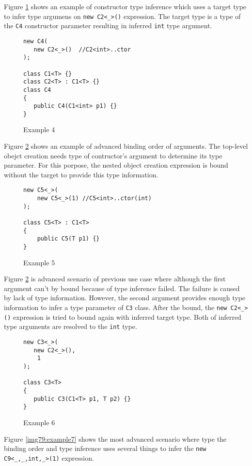 Figure \ref{img76:example4} shows an example of constructor type inference which uses a target type to infer type argumens on \texttt{new C2<\_>()} expression.
The target type is a type of the \texttt{C4} constructor parameter resulting in inferred \texttt{int} type argument.
\begin{figure}[h]
\begin{lstlisting}[style=csharp, showstringspaces=false]
new C4(
   new C2<_>()  //C2<int>..ctor
);

class C1<T> {}
class C2<T> : C1<T> {}
class C4 
{
   public C4(C1<int> p1) {}
}
\end{lstlisting}
\caption{Example 4}
\label{img76:example4}
\end{figure}
Figure \ref{img77:example5} shows an example of advanced binding order of arguments.
The top-level obejct creation needs type of contructor's argument to determine its type parameter.
For this porpose, the nested object creation expression is bound without the target to provide this type information.
\begin{figure}[h]
\begin{lstlisting}[style=csharp, showstringspaces=false]
new C5<_>(
    new C5<_>(1) //C5<int>..ctor(int)
);

class C5<T> : C1<T>
{
    public C5(T p1) {}
}
\end{lstlisting}
\caption{Example 5}
\label{img77:example5}
\end{figure}
Figure \ref{img77:example5} is advanced scenario of previous use case where although the first argument can't by bound because of type inference failed.
The failure is caused by lack of type information.
However, the second argument provides enough type information to infer a type parameter of \texttt{C3} class.
After the bound, the \texttt{new C2<\_>()} expression is tried to bound again with inferred target type.
Both of inferred type arguments are resolved to the \texttt{int} type.
\begin{figure}[h]
\begin{lstlisting}[style=csharp, showstringspaces=false]
new C3<_>(
   new C2<_>(),
    1
);

class C3<T>
{
   public C3(C1<T> p1, T p2) {}
}
\end{lstlisting}
\caption{Example 6}
\label{img78:example6}
\end{figure}
Figure \ref{img79:example7} shows the most advanced scenario where type the binding order and type inference uses several things to infer the \texttt{new C9<\_,\_,int,\_>(1)} expression.
